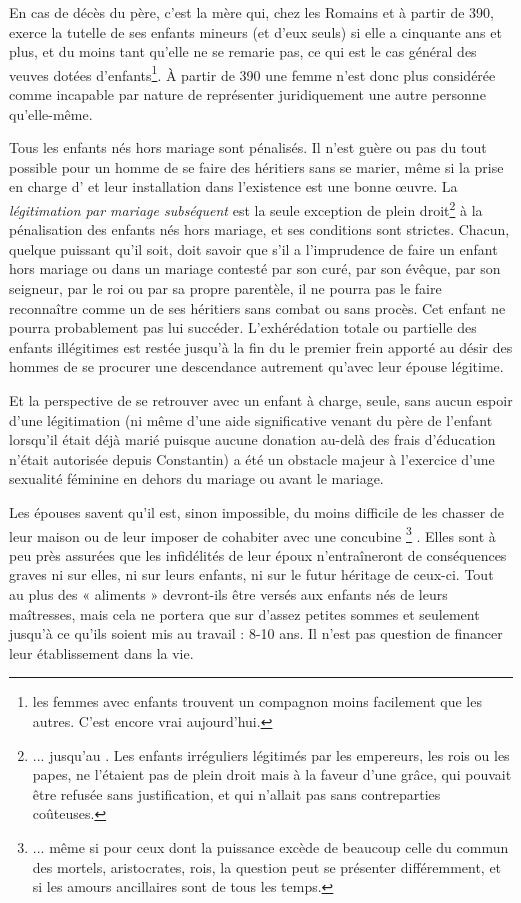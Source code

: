 En cas de décès du père, c'est la mère qui, chez les Romains et à partir de 390, exerce la tutelle de ses enfants mineurs (et d'eux seuls) si elle a cinquante ans et plus, et du moins tant qu'elle ne se remarie pas, ce qui est le cas général des veuves dotées d'enfants\footnote{les femmes avec enfants trouvent un compagnon moins facilement que les autres. C'est encore vrai aujourd'hui.}. À partir de 390 une femme n'est donc plus considérée comme incapable par nature de représenter juridiquement une autre personne qu'elle-même. 

 Tous les enfants nés hors mariage sont pénalisés. Il n'est guère ou pas du tout possible pour un homme de se faire des héritiers sans se marier, même si la prise en charge d' et leur installation dans l'existence est une bonne œuvre. La \emph{légitimation par mariage subséquent} est la seule exception de plein droit\footnote{... jusqu'au . Les enfants irréguliers légitimés par les empereurs, les rois ou les papes, ne l'étaient pas de plein droit mais à la faveur d'une grâce, qui pouvait être refusée sans justification, et qui n'allait pas sans contreparties coûteuses.} 
à la pénalisation des enfants nés hors mariage, et ses conditions sont strictes. Chacun, quelque puissant qu'il soit, doit savoir que s'il a l'imprudence de faire un enfant hors mariage ou dans un mariage contesté par son curé, par son évêque, par son seigneur, par le roi ou par sa propre parentèle, il ne pourra pas le faire reconnaître comme un de ses héritiers sans combat ou sans procès. Cet enfant ne pourra probablement pas lui succéder. L'exhérédation totale ou partielle des enfants illégitimes est restée jusqu'à la fin du  le premier frein apporté au désir des hommes de se procurer une descendance autrement qu'avec leur épouse légitime.

 Et la perspective de se retrouver avec un enfant à charge, seule, sans aucun espoir d'une légitimation (ni même d'une aide significative venant du père de l'enfant lorsqu'il était déjà marié puisque aucune donation au-delà des frais d'éducation n'était autorisée depuis Constantin) a été un obstacle majeur à l'exercice d'une sexualité féminine en dehors du mariage ou avant le mariage. 

 Les épouses savent qu'il est, sinon impossible, du moins difficile de les chasser de leur maison ou de leur imposer de cohabiter avec une concubine
\footnote{... même si pour ceux dont la puissance excède de beaucoup celle du commun des mortels, aristocrates, rois, la question peut se présenter différemment, et si les amours ancillaires sont de tous les temps.}%
. Elles sont à peu près assurées que les infidélités de leur époux n'entraîneront de conséquences graves ni sur elles, ni sur leurs enfants, ni sur le futur héritage de ceux-ci. Tout au plus des « aliments » devront-ils être versés aux enfants nés de leurs maîtresses, mais cela ne portera que sur d'assez petites sommes et seulement jusqu'à ce qu'ils soient mis au travail : 8-10 ans. Il n'est pas question de financer leur établissement dans la vie. 




